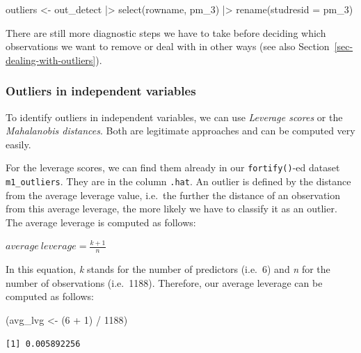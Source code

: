 \documentclass[
  letterpaper,
]{krantz}
\makeatletter
\newenvironment{Shaded}{\begin{snugshade}}{\end{snugshade}}
\newcommand{\AttributeTok}[1]{\textcolor[rgb]{0.40,0.45,0.13}{#1}}
\newcommand{\DecValTok}[1]{\textcolor[rgb]{0.68,0.00,0.00}{#1}}
\newcommand{\FunctionTok}[1]{\textcolor[rgb]{0.28,0.35,0.67}{#1}}
\newcommand{\NormalTok}[1]{\textcolor[rgb]{0.00,0.23,0.31}{#1}}
\newcommand{\OtherTok}[1]{\textcolor[rgb]{0.00,0.23,0.31}{#1}}
\newcommand{\SpecialCharTok}[1]{\textcolor[rgb]{0.37,0.37,0.37}{#1}}
\newenvironment{kframe}{%
\medskip{}
\setlength{\fboxsep}{.8em}
 \def\at@end@of@kframe{}%
 \ifinner\ifhmode%
  \def\at@end@of@kframe{\end{minipage}}%
  \begin{minipage}{\columnwidth}%
 \fi\fi%
 \def\FrameCommand##1{\hskip\@totalleftmargin \hskip-\fboxsep
 \colorbox{shadecolor}{##1}\hskip-\fboxsep
     \hskip-\linewidth \hskip-\@totalleftmargin \hskip\columnwidth}%
 \MakeFramed {\advance\hsize-\width
   \@totalleftmargin\z@ \linewidth\hsize
   \@setminipage}}%
 {\par\unskip\endMakeFramed%
 \at@end@of@kframe}
\renewenvironment{Shaded}{\begin{kframe}}{\end{kframe}}
\makeatother
\begin{document}
\begin{Shaded}
\begin{Highlighting}[]
\NormalTok{outliers }\OtherTok{\textless{}{-}}
\NormalTok{  out\_detect }\SpecialCharTok{|\textgreater{}}
  \FunctionTok{select}\NormalTok{(rowname, pm\_3) }\SpecialCharTok{|\textgreater{}}
  \FunctionTok{rename}\NormalTok{(}\AttributeTok{studresid =}\NormalTok{ pm\_3)}
\end{Highlighting}
\end{Shaded}

There are still more diagnostic steps we have to take before deciding
which observations we want to remove or deal with in other ways (see
also Section~\ref{sec-dealing-with-outliers}).

\subsubsection{Outliers in independent
variables}\label{sec-outliers-in-the-independent-variables}

To identify outliers in independent variables, we can use \emph{Leverage
scores} or the \emph{Mahalanobis distances}. Both are legitimate
approaches and can be computed very easily.

For the leverage scores, we can find them already in our
\texttt{fortify()}-ed dataset \texttt{m1\_outliers}. They are in the
column \texttt{.hat}. An outlier is defined by the distance from the
average leverage value, i.e.~the further the distance of an observation
from this average leverage, the more likely we have to classify it as an
outlier. The average leverage is computed as follows:

\label{average-leverage-equation}
\(average\ leverage = \frac{k + 1}{n}\)

In this equation, \emph{k} stands for the number of predictors (i.e.~6)
and \emph{n} for the number of observations (i.e.~1188). Therefore, our
average leverage can be computed as follows:

\begin{Shaded}
\begin{Highlighting}[]
\NormalTok{(avg\_lvg }\OtherTok{\textless{}{-}}\NormalTok{ (}\DecValTok{6} \SpecialCharTok{+} \DecValTok{1}\NormalTok{) }\SpecialCharTok{/} \DecValTok{1188}\NormalTok{)}
\end{Highlighting}
\end{Shaded}

\begin{verbatim}
[1] 0.005892256
\end{verbatim}
\end{document}
